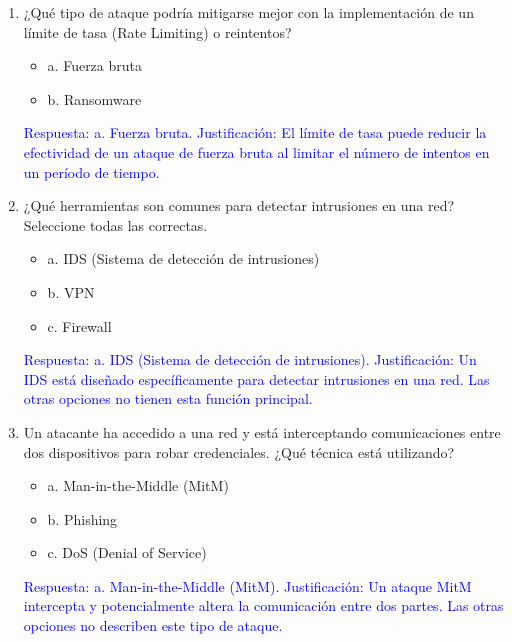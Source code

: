 \documentclass[a4paper]{article}
\begin{document}
\begin{enumerate}
    \item ¿Qué tipo de ataque podría mitigarse mejor con la implementación de un límite de tasa (Rate Limiting) o reintentos? 
    \begin{itemize}
        \item a. Fuerza bruta
        \item b. Ransomware
    \end{itemize}
    \textcolor{blue}{Respuesta: a. Fuerza bruta. Justificación: El límite de tasa puede reducir la efectividad de un ataque de fuerza bruta al limitar el número de intentos en un período de tiempo.}
    \vspace{1cm}
    
    \item ¿Qué herramientas son comunes para detectar intrusiones en una red? Seleccione todas las correctas.
    \begin{itemize}
        \item a. IDS (Sistema de detección de intrusiones)
        \item b. VPN
        \item c. Firewall
    \end{itemize}
    \textcolor{blue}{Respuesta: a. IDS (Sistema de detección de intrusiones). Justificación: Un IDS está diseñado específicamente para detectar intrusiones en una red. Las otras opciones no tienen esta función principal.}
    \vspace{1cm}
    
    \item Un atacante ha accedido a una red y está interceptando comunicaciones entre dos dispositivos para robar credenciales. ¿Qué técnica está utilizando? %
    \begin{itemize}
        \item a. Man-in-the-Middle (MitM)
        \item b. Phishing
        \item c. DoS (Denial of Service)
    \end{itemize}
    \textcolor{blue}{Respuesta: a. Man-in-the-Middle (MitM). Justificación: Un ataque MitM intercepta y potencialmente altera la comunicación entre dos partes. Las otras opciones no describen este tipo de ataque.}
    \vspace{1cm}
    

\end{enumerate}
\end{document}
